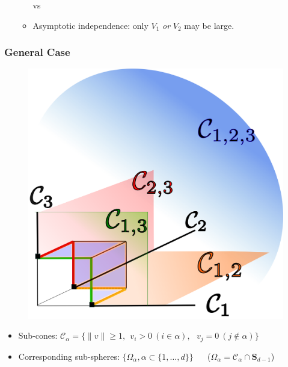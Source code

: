 \documentclass[10pt]{beamer}
\begin{document}
\begin{frame}
\begin{itemize}
\begin{itemize}
\bigskip
vs
\bigskip

\item Asymptotic independence: only $V_1$ \emph{or} $V_2$ may be large.
    \end{itemize}
  \end{itemize}
\end{frame}


\begin{frame}
\frametitle{General Case}
  \begin{figure}
    \centering
    \includegraphics[width=0.4\linewidth]{sourcefigs/cone}
  \end{figure}
  \begin{itemize}
\item Sub-cones:  $\mathcal{C}_\alpha = \big\{\|v\|\ge 1,~~ v_i> 0 ~ (i\in\alpha),~~~  v_j = 0~(j\notin\alpha)\big\}$

\item   Corresponding sub-spheres: $\big\{\Omega_\alpha , \alpha\subset\{1,\dotsc,d\}\big\}$ ~~ ($\Omega_\alpha = \mathcal{C}_\alpha \cap \mathbf{S}_{d-1}$)
\end{itemize}
\end{frame}


  
\end{document}

